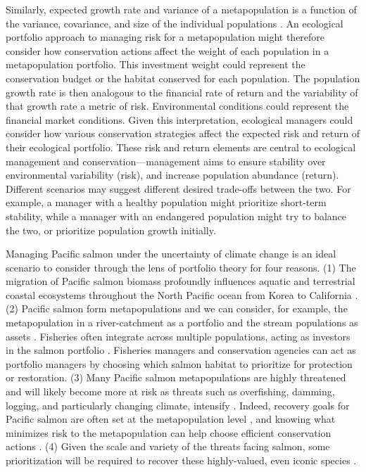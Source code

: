Similarly, expected growth rate and variance of a metapopulation is a function of the variance, covariance, and size of the individual populations \citep{moore2010, carlson2011, anderson2013}. An ecological portfolio approach to managing risk for a metapopulation might therefore consider how conservation actions affect the weight of each population in a metapopulation portfolio. This investment weight could represent the conservation budget or the habitat conserved for each population. The population growth rate is then analogous to the financial rate of return and the variability of that growth rate a metric of risk. Environmental conditions could represent the financial market conditions. Given this interpretation, ecological managers could consider how various conservation strategies affect the expected risk and return of their ecological portfolio. These risk and return elements are central to ecological management and conservation---management aims to ensure stability over environmental variability (risk), and increase population abundance (return). Different scenarios may suggest different desired trade-offs between the two. For example, a manager with a healthy population might prioritize short-term stability, while a manager with an endangered population might try to balance the two, or prioritize population growth initially.

Managing Pacific salmon under the uncertainty of climate change is an ideal scenario to consider through the lens of portfolio theory for four reasons. (1) The migration of Pacific salmon biomass profoundly influences aquatic and terrestrial coastal ecosystems throughout the North Pacific ocean from Korea to California \citep{quinn2005}. (2) Pacific salmon form metapopulations \citep[e.g.][]{policansky1998, cooper1999, schtickzelle2007} and we can consider, for example, the metapopulation in a river-catchment as a portfolio and the stream populations as assets \citep{schindler2010, moore2010, carlson2011, anderson2013, yeakel2014}. Fisheries often integrate across multiple populations, acting as investors in the salmon portfolio \citep{hilborn2003}. Fisheries managers and conservation agencies can act as portfolio managers by choosing which salmon habitat to prioritize for protection or restoration. (3) Many Pacific salmon metapopulations are highly threatened \citep[e.g.][]{gustafson2007} and will likely become more at risk as threats such as overfishing, damming, logging, and particularly changing climate, intensify \citep[e.g.][]{lackey2003}. Indeed, recovery goals for Pacific salmon are often set at the metapopulation level \citep{mcelhany2000}, and knowing what minimizes risk to the metapopulation can help choose efficient conservation actions \citep{policansky1998, mcelhany2000}. (4) Given the scale and variety of the threats facing salmon, some prioritization will be required to recover these highly-valued, even iconic species \citep{allendorf1997, ruckelshaus2002}.

